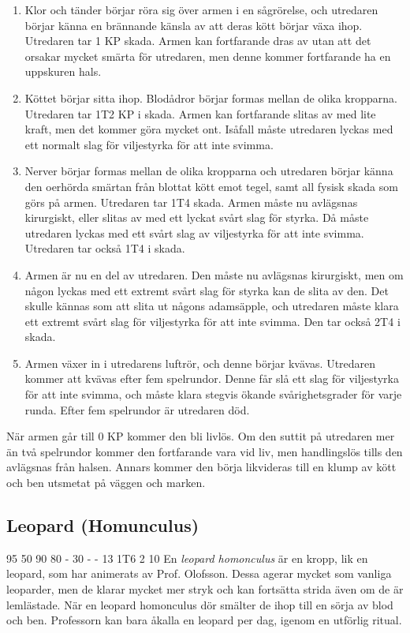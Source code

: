 {\begin{enumerate}
	\item Klor och tänder börjar röra sig över armen i en sågrörelse, och utredaren börjar känna en brännande känsla av att deras kött börjar växa ihop. Utredaren tar 1 KP skada. Armen kan fortfarande dras av utan att det orsakar mycket smärta för utredaren, men denne kommer fortfarande ha en uppskuren hals.
	\item Köttet börjar sitta ihop. Blodådror börjar formas mellan de olika kropparna. Utredaren tar 1T2 KP i skada. Armen kan fortfarande slitas av med lite kraft, men det kommer göra mycket ont. Isåfall måste utredaren lyckas med ett normalt slag för viljestyrka för att inte svimma.
	\item Nerver börjar formas mellan de olika kropparna och utredaren börjar känna den oerhörda smärtan från blottat kött emot tegel, samt all fysisk skada som görs på armen. Utredaren tar 1T4 skada. Armen måste nu avlägsnas kirurgiskt, eller slitas av med ett lyckat svårt slag för styrka. Då måste utredaren lyckas med ett svårt slag av viljestyrka för att inte svimma. Utredaren tar också 1T4 i skada.
	\item Armen är nu en del av utredaren. Den måste nu avlägsnas kirurgiskt, men om någon lyckas med ett extremt svårt slag för styrka kan de slita av den. Det skulle kännas som att slita ut någons adamsäpple, och utredaren måste klara ett extremt svårt slag för viljestyrka för att inte svimma. Den tar också 2T4 i skada.
	\item Armen växer in i utredarens luftrör, och denne börjar kvävas. Utredaren kommer att kvävas efter fem spelrundor. Denne får slå ett slag för viljestyrka för att inte svimma, och måste klara stegvis ökande svårighetsgrader för varje runda. Efter fem spelrundor är utredaren död.
\end{enumerate}
%
När armen går till 0 KP kommer den bli livlös. Om den suttit på utredaren mer än två spelrundor kommer den fortfarande vara vid liv, men handlingslös tills den avlägsnas från halsen. Annars kommer den börja likvideras till en klump av kött och ben utsmetat på väggen och marken.
}

\subsection{Leopard (Homunculus)}
\label{var:Leopard}
\character
{95}	%
{50}	%
{90}	%
{80}	%
{-}		%
{30}	%
{-}		%
{-}		%
{13}	%
{1T6}	%
{2}		%
{10}	%
%
{
}
%
{
En \textit{leopard homonculus} är en kropp, lik en leopard, som har animerats av Prof. Olofsson. Dessa agerar mycket som vanliga leoparder, men de klarar mycket mer stryk och kan fortsätta strida även om de är lemlästade. När en leopard homonculus dör smälter de ihop till en sörja av blod och ben. Professorn kan bara åkalla en leopard per dag, igenom en utförlig ritual.
}
%
